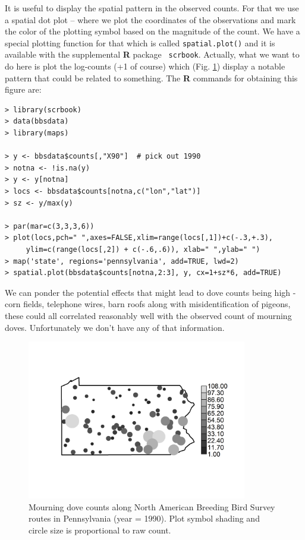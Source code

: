 It is useful to display the spatial pattern in the observed
counts. For that we use a spatial dot plot -- where we plot the
coordinates of the observations and mark the color of the plotting
symbol based on the magnitude of the count.  We have a special
plotting function for that which is called \mbox{\tt spatial.plot()}
and it is available with the supplemental {\bf R} package \mbox{\tt
  scrbook}.  Actually, what we want to do here is plot the log-counts
(+1 of course) which (Fig. \ref{glms.fig.padovecounts}) display a
notable pattern that could be related to something. The {\bf R}
commands for obtaining this figure are: 
{\small
\begin{verbatim}
> library(scrbook)
> data(bbsdata)
> library(maps)

> y <- bbsdata$counts[,"X90"]  # pick out 1990
> notna <- !is.na(y)
> y <- y[notna]
> locs <- bbsdata$counts[notna,c("lon","lat")]
> sz <- y/max(y)

> par(mar=c(3,3,3,6))
> plot(locs,pch=" ",axes=FALSE,xlim=range(locs[,1])+c(-.3,+.3),
     ylim=c(range(locs[,2]) + c(-.6,.6)), xlab=" ",ylab=" ")
> map('state', regions='pennsylvania', add=TRUE, lwd=2)
> spatial.plot(bbsdata$counts[notna,2:3], y, cx=1+sz*6, add=TRUE)
\end{verbatim}
}
We can ponder the potential effects that
might lead to dove counts being high - corn fields, telephone wires,
barn roofs along with misidentification of pigeons, these could all
correlated reasonably well with the observed count of mourning doves.
Unfortunately we don't have any of that information.
\begin{figure}[ht]
\begin{center}
\includegraphics[height=2.75in]{Ch3-Bayes/figs/pacounts}
\end{center}
\caption{ Mourning dove counts along North American Breeding Bird
  Survey routes in Pennsylvania (year = 1990). Plot symbol shading and
  circle size is proportional to raw count. }
\label{glms.fig.padovecounts}
\end{figure}
